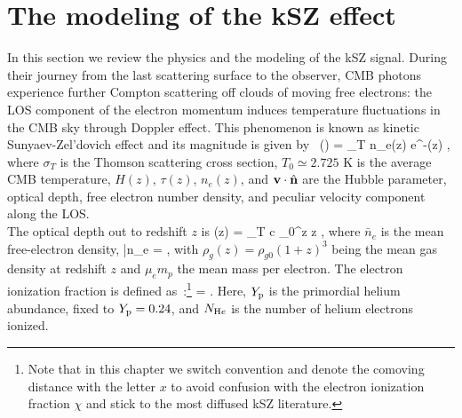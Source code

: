 \section{The modeling of the kSZ effect}\label{Sec:kSZ}
In this section we review the physics and the modeling of the kSZ signal.  During their journey from the last scattering surface to the observer, CMB photons experience further Compton scattering off clouds of moving free electrons: the \gls{LOS} component of the electron momentum induces temperature fluctuations in the CMB sky through Doppler effect. This phenomenon is known as kinetic Sunyaev-Zel'dovich effect and its magnitude is given by~\citep{Sunyaev1980}
\be
\label{delta_T_v}
(\nver)  = \sigma_T \int {}n_e(z) e^{-\tau(z)}  \cdot \nver,
\ee
where $\sigma_T$ is the Thomson scattering cross section, $T_0\simeq 2.725$ K is the average CMB temperature, $H(z)$, $\tau(z)$, $n_e(z)$, and $\mathbf{v} \cdot \nver$ are the Hubble parameter, optical depth, free electron number density, and peculiar velocity component along the LOS. \\
The optical depth out to redshift $z$ is 
\be
\tau(z) = \sigma_T c \int_0^{z} \diff z ,
\ee
 where $\bar{n}_e$ is the mean free-electron density,
\be
\bar{n}_e = ,
\ee
with $\rho_g(z) = \rho_{g0}(1+z)^3$ being the mean gas density at redshift $z$ and $\mu_em_p$ the mean mass per electron. The electron ionization fraction is defined as~\citep{Shaw2012,Ma2014a}:\footnote{Note that in this chapter we switch convention and denote the comoving distance with the letter $x$ to avoid confusion with the electron ionization fraction $\chi$ and stick to the most diffused kSZ literature.}
\be
\label{chi}
\chi = .
\ee
Here, $Y_{\rm p}$ is the primordial helium abundance, fixed to $Y_{\rm p} = 0.24$, and $N_{\rm He}$ is the number of helium electrons ionized.

